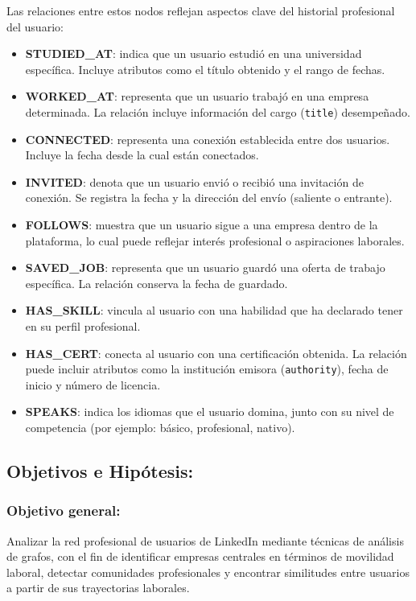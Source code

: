 \documentclass[10pt]{article}
\begin{document}
Las relaciones entre estos nodos reflejan aspectos clave del historial profesional del usuario:

\begin{itemize}
	\item \textbf{STUDIED\_AT}: indica que un usuario estudió en una universidad específica. Incluye atributos como el título obtenido y el rango de fechas.
	      
	\item \textbf{WORKED\_AT}: representa que un usuario trabajó en una empresa determinada. La relación incluye información del cargo (\texttt{title}) desempeñado.
	      
	\item \textbf{CONNECTED}: representa una conexión establecida entre dos usuarios. Incluye la fecha desde la cual están conectados.
	      
	\item \textbf{INVITED}: denota que un usuario envió o recibió una invitación de conexión. Se registra la fecha y la dirección del envío (saliente o entrante).
	      
	\item \textbf{FOLLOWS}: muestra que un usuario sigue a una empresa dentro de la plataforma, lo cual puede reflejar interés profesional o aspiraciones laborales.
	      
	\item \textbf{SAVED\_JOB}: representa que un usuario guardó una oferta de trabajo específica. La relación conserva la fecha de guardado.
	      
	\item \textbf{HAS\_SKILL}: vincula al usuario con una habilidad que ha declarado tener en su perfil profesional.
	      
	\item \textbf{HAS\_CERT}: conecta al usuario con una certificación obtenida. La relación puede incluir atributos como la institución emisora (\texttt{authority}), fecha de inicio y número de licencia.
	      
	\item \textbf{SPEAKS}: indica los idiomas que el usuario domina, junto con su nivel de competencia (por ejemplo: básico, profesional, nativo).
\end{itemize}
\subsection{Objetivos e Hipótesis:}

\subsubsection{Objetivo general:}
Analizar la red profesional de usuarios de LinkedIn mediante técnicas de análisis de grafos, con el fin de identificar empresas centrales en términos de movilidad laboral, detectar comunidades profesionales y encontrar similitudes entre usuarios a partir de sus trayectorias laborales.
\end{document}
